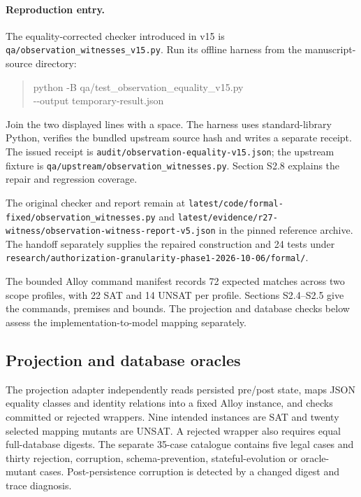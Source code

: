 \documentclass[11pt,a4paper]{article}
\newcommand{\code}[1]{\nolinkurl{#1}}
\begin{document}
\paragraph{Reproduction entry.} The equality-corrected checker introduced in v15 is \code{qa/observation_witnesses_v15.py}. Run its offline harness from the manuscript-source directory:
\begin{quote}\ttfamily\small
python -B qa/test\_observation\_equality\_v15.py\\
\hspace*{1em}-{}-output temporary-result.json
\end{quote}
Join the two displayed lines with a space. The harness uses standard-library Python, verifies the bundled upstream source hash and writes a separate receipt. The issued receipt is \code{audit/observation-equality-v15.json}; the upstream fixture is \code{qa/upstream/observation_witnesses.py}. Section S2.8 explains the repair and regression coverage.

The original checker and report remain at \code{latest/code/formal-fixed/observation_witnesses.py} and \code{latest/evidence/r27-witness/observation-witness-report-v5.json} in the pinned reference archive. The handoff separately supplies the repaired construction and 24 tests under \code{research/authorization-granularity-phase1-2026-10-06/formal/}.

The bounded Alloy command manifest records 72 expected matches across two scope profiles, with 22 SAT and 14 UNSAT per profile. Sections S2.4--S2.5 give the commands, premises and bounds. The projection and database checks below assess the implementation-to-model mapping separately.

\subsection{Projection and database oracles}

The projection adapter independently reads persisted pre/post state, maps JSON equality classes and identity relations into a fixed Alloy instance, and checks committed or rejected wrappers. Nine intended instances are SAT and twenty selected mapping mutants are UNSAT. A rejected wrapper also requires equal full-database digests. The separate 35-case catalogue contains five legal cases and thirty rejection, corruption, schema-prevention, stateful-evolution or oracle-mutant cases. Post-persistence corruption is detected by a changed digest and trace diagnosis.
\end{document}
